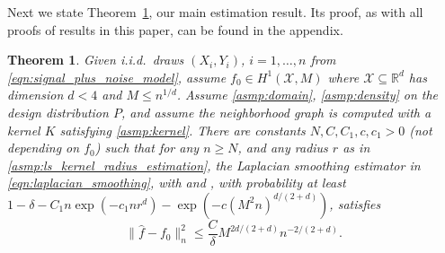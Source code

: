 \documentclass[twoside]{article}
\newcommand{\Reals}{\mathbb{R}}
\newcommand{\1}{\mathbf{1}}
\newcommand{\Rd}{\Reals^d}
\newcommand{\Xset}{\mathcal{X}}
\newcommand{\wh}[1]{\widehat{#1}}
\newtheorem{theorem}{Theorem}
\theoremstyle{definition}
\theoremstyle{remark}
\begin{document}
Next we state Theorem~\ref{thm:laplacian_smoothing_estimation1}, our main estimation result. Its proof, as with all proofs of results in this paper, can be found in the appendix. 
\begin{theorem}
	\label{thm:laplacian_smoothing_estimation1}
	Given i.i.d.\ draws $(X_i,Y_i)$, $i=1,\ldots,n$ from \eqref{eqn:signal_plus_noise_model}, assume $f_0 \in H^1(\Xset,M)$ where $\Xset \subseteq \Rd$ has dimension $d < 4$ and $M \leq n^{1/d}$. Assume \ref{asmp:domain}, \ref{asmp:density} on the design distribution $P$, and assume the neighborhood graph  is computed with a kernel $K$ satisfying \ref{asmp:kernel}. There are constants $N,C,C_1,c,c_1>0$ (not depending on $f_0$) such that for any $n \geq N$, and any radius $r$ as in \ref{asmp:ls_kernel_radius_estimation}, the Laplacian smoothing estimator \smash{$\wh{f}$} in \eqref{eqn:laplacian_smoothing}, with  and , 
	with probability at least $1 - \delta -  C_1n\exp(-c_1nr^d) - \exp(-c (M^2n)^{d/(2 + d)})$, satisfies
	\begin{equation*}
	\bigl\|\wh{f} - f_0\bigr\|_n^2 \leq \frac{C}{\delta} M^{2d/(2 + d)} n^{-2/(2 + d)}.
	\end{equation*}
\end{theorem}
\end{document}
